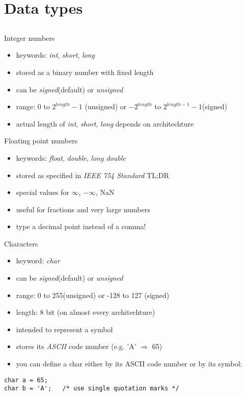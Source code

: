 \section{Data types}
\subsection{}
\begin{frame}{Integer numbers}
	\begin{itemize}
		\item keywords: \textit{int}, \textit{short}, \textit{long}
		\item stored as a binary number with fixed length
		\item can be \textit{signed}(default) or \textit{unsigned} 
		\item range: 0 to $2^{length}-1$ (unsigned) or $-2^{length}$ to $2^{length-1}-1$(signed)
		\item actual length of \textit{int}, \textit{short}, \textit{long} depends on architechture
	\end{itemize}
\end{frame}
\begin{frame}{Floating point numbers}
	\begin{itemize}
		\item keywords: \textit{float}, \textit{double}, \textit{long double}
		\item stored as specified in \textit{IEEE 754 Standard} TL;DR
		\item special values for $\infty$, $-\infty$, NaN
		\item useful for fractions and very large numbers
		\item type a decimal point instead of a comma!
	\end{itemize}
\end{frame}
\begin{frame}[fragile]{Characters}
	\begin{itemize}
		\item keyword: \textit{char}
		\item can be \textit{signed}(default) or \textit{unsigned}
		\item range: 0 to 255(unsigned) or -128 to 127 (signed)	
		\item length: 8 bit (on almost every architechture)
		\item intended to represent a symbol
		\item stores its \textit{ASCII} code number (e.g. 'A' $\Rightarrow$ 65)
		\item you can define a char either by its ASCII code number or by its symbol:
	\end{itemize}
	\begin{lstlisting}[numbers=none]
char a = 65;
char b = 'A';	/* use single quotation marks */
\end{lstlisting}
\end{frame}
